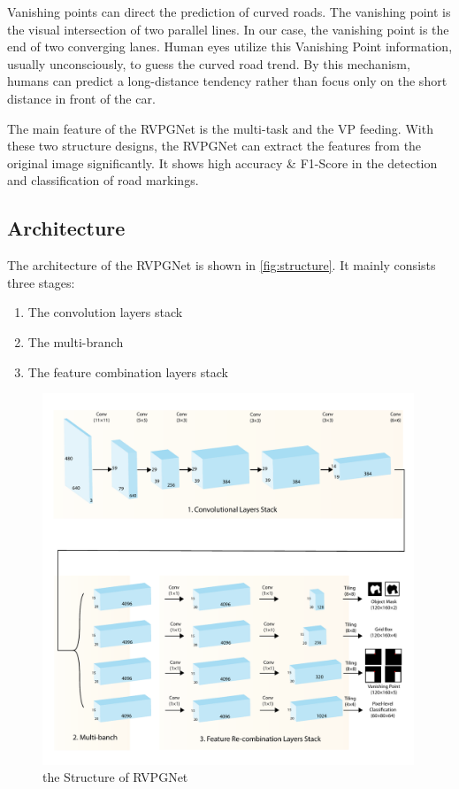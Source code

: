 \begin{spacing}{1.5}
Vanishing points can direct the prediction of curved roads. The vanishing point is the visual intersection of two parallel lines. In our case, the vanishing point is the end of two converging lanes. Human eyes utilize this Vanishing Point information, usually unconsciously, to guess the curved road trend. By this mechanism, humans can predict a long-distance tendency rather than focus only on the short distance in front of the car.

The main feature of the RVPGNet is the multi-task and the VP feeding. With these two structure designs, the RVPGNet can extract the features from the original image significantly. It shows high accuracy \& F1-Score in the detection and classification of road markings.

\subsection{Architecture}

The architecture of the RVPGNet is shown in \autoref{fig:structure}. It mainly consists three stages:

\begin{enumerate} \vspace{-5mm}
    \item The convolution layers stack
    \item The multi-branch
    \item The feature combination layers stack
\end{enumerate} \vspace{-5mm}

\begin{figure}[ht]
\centering
\includegraphics[width=0.99\textwidth, fbox]{Chapter3/structure.pdf}
\caption{the Structure of RVPGNet}
\label{fig:structure} 
\end{figure}


\end{spacing}
